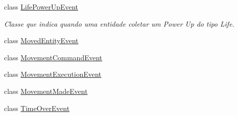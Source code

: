 \begin{DoxyCompactItemize}
class \hyperlink{classbr_1_1unb_1_1unbomber_1_1event_1_1_life_power_up_event}{Life\+Power\+Up\+Event}
\begin{DoxyCompactList}\small\item\em Classe que indica quando uma entidade coletar um Power Up do tipo Life. \end{DoxyCompactList}\item 
class \hyperlink{classbr_1_1unb_1_1unbomber_1_1event_1_1_moved_entity_event}{Moved\+Entity\+Event}
\item 
class \hyperlink{classbr_1_1unb_1_1unbomber_1_1event_1_1_movement_command_event}{Movement\+Command\+Event}
\item 
class \hyperlink{classbr_1_1unb_1_1unbomber_1_1event_1_1_movement_execution_event}{Movement\+Execution\+Event}
\item 
class \hyperlink{classbr_1_1unb_1_1unbomber_1_1event_1_1_movement_made_event}{Movement\+Made\+Event}
\item 
class \hyperlink{classbr_1_1unb_1_1unbomber_1_1event_1_1_time_over_event}{Time\+Over\+Event}
\end{DoxyCompactItemize}
